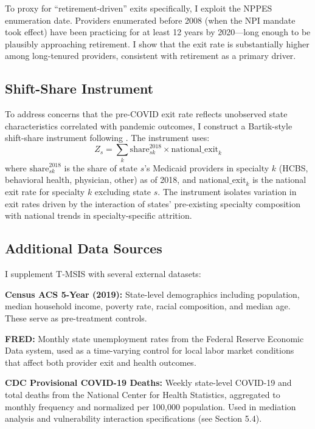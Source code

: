 \documentclass[12pt]{article}
\begin{document}
To proxy for ``retirement-driven'' exits specifically, I exploit the NPPES enumeration date. Providers enumerated before 2008 (when the NPI mandate took effect) have been practicing for at least 12 years by 2020---long enough to be plausibly approaching retirement. I show that the exit rate is substantially higher among long-tenured providers, consistent with retirement as a primary driver.

\subsection{Shift-Share Instrument}

To address concerns that the pre-COVID exit rate reflects unobserved state characteristics correlated with pandemic outcomes, I construct a Bartik-style shift-share instrument following \citet{goldsmithpinkham2020}. The instrument uses:
\begin{equation}
Z_s = \sum_k \text{share}_{sk}^{2018} \times \text{national\_exit}_k
\end{equation}
where $\text{share}_{sk}^{2018}$ is the share of state $s$'s Medicaid providers in specialty $k$ (HCBS, behavioral health, physician, other) as of 2018, and $\text{national\_exit}_k$ is the national exit rate for specialty $k$ excluding state $s$. The instrument isolates variation in exit rates driven by the interaction of states' pre-existing specialty composition with national trends in specialty-specific attrition.

\subsection{Additional Data Sources}

I supplement T-MSIS with several external datasets:

\textbf{Census ACS 5-Year (2019):} State-level demographics including population, median household income, poverty rate, racial composition, and median age. These serve as pre-treatment controls.

\textbf{FRED:} Monthly state unemployment rates from the Federal Reserve Economic Data system, used as a time-varying control for local labor market conditions that affect both provider exit and health outcomes.

\textbf{CDC Provisional COVID-19 Deaths:} Weekly state-level COVID-19 and total deaths from the National Center for Health Statistics, aggregated to monthly frequency and normalized per 100,000 population. Used in mediation analysis and vulnerability interaction specifications (see Section 5.4).
\end{document}
